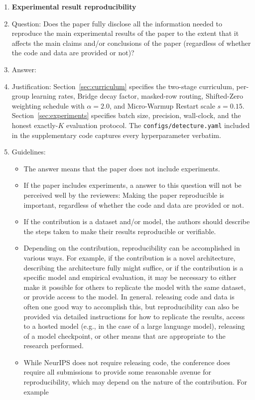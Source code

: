 \begin{enumerate}
    \item {\bf Experimental result reproducibility}
    \item[] Question: Does the paper fully disclose all the information needed to reproduce the main experimental results of the paper to the extent that it affects the main claims and/or conclusions of the paper (regardless of whether the code and data are provided or not)?
    \item[] Answer: \answerYes{}
    \item[] Justification: Section~\ref{sec:curriculum} specifies the two-stage curriculum, per-group learning rates, Bridge decay factor, masked-row routing, Shifted-Zero weighting schedule with $\alpha = 2.0$, and Micro-Warmup Restart scale $s = 0.15$. Section~\ref{sec:experiments} specifies batch size, precision, wall-clock, and the honest exactly-$K$ evaluation protocol. The \texttt{configs/detecture.yaml} included in the supplementary code captures every hyperparameter verbatim.
    \item[] Guidelines:
    \begin{itemize}
        \item The answer \answerNA{} means that the paper does not include experiments.
        \item If the paper includes experiments, a \answerNo{} answer to this question will not be perceived well by the reviewers: Making the paper reproducible is important, regardless of whether the code and data are provided or not.
        \item If the contribution is a dataset and\slash or model, the authors should describe the steps taken to make their results reproducible or verifiable.
        \item Depending on the contribution, reproducibility can be accomplished in various ways. For example, if the contribution is a novel architecture, describing the architecture fully might suffice, or if the contribution is a specific model and empirical evaluation, it may be necessary to either make it possible for others to replicate the model with the same dataset, or provide access to the model. In general. releasing code and data is often one good way to accomplish this, but reproducibility can also be provided via detailed instructions for how to replicate the results, access to a hosted model (e.g., in the case of a large language model), releasing of a model checkpoint, or other means that are appropriate to the research performed.
        \item While NeurIPS does not require releasing code, the conference does require all submissions to provide some reasonable avenue for reproducibility, which may depend on the nature of the contribution. For example

\end{itemize}
\end{enumerate}
